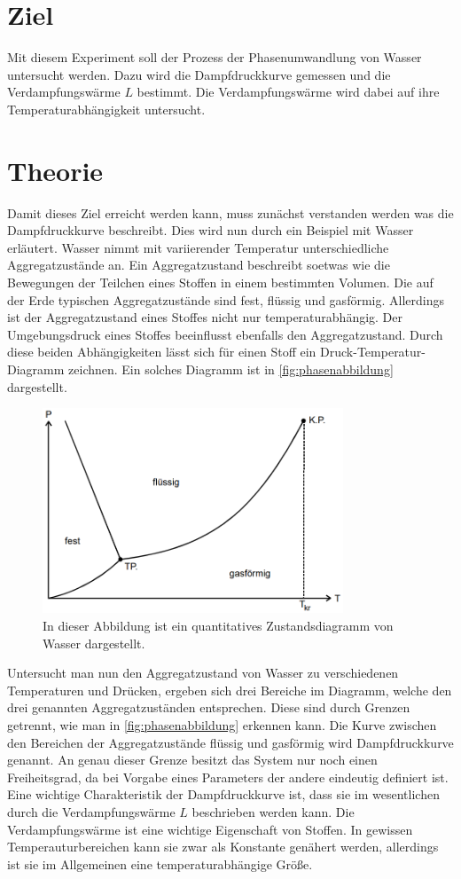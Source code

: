 \section{Ziel}
\label{sec:Ziel}
Mit diesem Experiment soll der Prozess der Phasenumwandlung von Wasser untersucht werden. Dazu wird die Dampfdruckkurve gemessen und die Verdampfungswärme $L$ bestimmt. Die Verdampfungswärme wird
dabei auf ihre Temperaturabhängigkeit untersucht.
\section{Theorie}
\label{sec:Theorie}
Damit dieses Ziel erreicht werden kann, muss zunächst verstanden werden was die Dampfdruckkurve beschreibt. Dies wird nun durch ein Beispiel mit Wasser erläutert.
Wasser nimmt mit variierender Temperatur unterschiedliche Aggregatzustände an. Ein Aggregatzustand beschreibt soetwas wie die Bewegungen der Teilchen eines Stoffen in einem bestimmten Volumen.
Die auf der Erde typischen Aggregatzustände sind fest, flüssig und gasförmig. Allerdings ist der Aggregatzustand eines Stoffes nicht nur temperaturabhängig. Der Umgebungsdruck eines Stoffes 
beeinflusst ebenfalls den Aggregatzustand. Durch diese beiden Abhängigkeiten lässt sich für einen Stoff ein Druck-Temperatur-Diagramm zeichnen. Ein solches Diagramm ist in \autoref{fig:phasenabbildung}
dargestellt.
\begin{figure}
    \centering
    \includegraphics[width=0.8\textwidth]{content/Phasenabbildung.PNG}
	\caption{In dieser Abbildung ist ein quantitatives Zustandsdiagramm von Wasser dargestellt. \cite{v203}}
	\label{fig:phasenabbildung}
\end{figure}
Untersucht man nun den Aggregatzustand von Wasser zu verschiedenen Temperaturen und Drücken, ergeben sich drei Bereiche im Diagramm, welche den drei genannten Aggregatzuständen entsprechen.  
Diese sind durch Grenzen
getrennt, wie man in \autoref{fig:phasenabbildung} erkennen kann. Die Kurve zwischen den Bereichen der Aggregatzustände flüssig und gasförmig wird Dampfdruckkurve genannt. An genau dieser Grenze besitzt das System
nur noch einen Freiheitsgrad, da bei Vorgabe eines Parameters der andere eindeutig definiert ist. Eine wichtige Charakteristik der Dampfdruckkurve ist, dass sie im wesentlichen durch die 
Verdampfungswärme $L$ beschrieben werden kann. Die Verdampfungswärme ist eine wichtige Eigenschaft von Stoffen. In gewissen Temperauturbereichen kann sie zwar als Konstante genähert werden,
allerdings ist sie im Allgemeinen eine temperaturabhängige Größe. 

